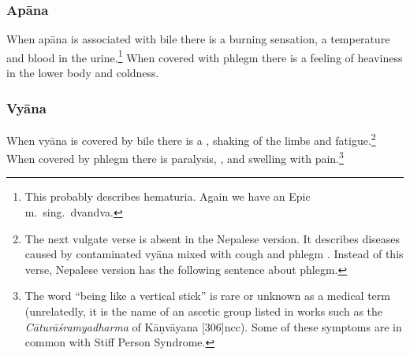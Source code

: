 \begin{translation}
\subsubsection{Apāna}

\item[37cd--38ab]

	When apāna is associated with bile  there is a burning sensation, a temperature 
	and blood in the urine.\footnote{This probably describes hematuria.  Again 
	we have an Epic m.\ sing.\ dvandva.}
     When  covered with phlegm there is a feeling of
	heaviness in the lower body and coldness.




\subsubsection{Vyāna}

\item[38cd--39.1]

When vyāna is covered by bile there is a ,
shaking of the limbs and fatigue.\footnote{The next vulgate verse is
    absent in the Nepalese version.  It describes diseases caused by
    contaminated vyāna mixed with cough and phlegm \citep[264]{vulgate}.
    Instead of this verse, Nepalese version has the following sentence
    about phlegm.} When covered by phlegm there is paralysis,
    , and swelling with pain.\footnote{The word
         “being like a vertical stick” is rare or unknown as a
        medical term (unrelatedly, it is the name of an ascetic group listed
        in works such as the \emph{Cāturāśramyadharma} of Kāṇvāyana 
        [306]{ncc}). Some of
        these symptoms are in common with Stiff Person Syndrome.}
 

\item[40--41]


\end{translation}
